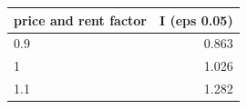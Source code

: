 \begin{tabular}{lr}
\toprule
price and rent factor & I (eps 0.05) \\
\midrule
0.9 & 0.863 \\
1 & 1.026 \\
1.1 & 1.282 \\
\bottomrule
\end{tabular}
